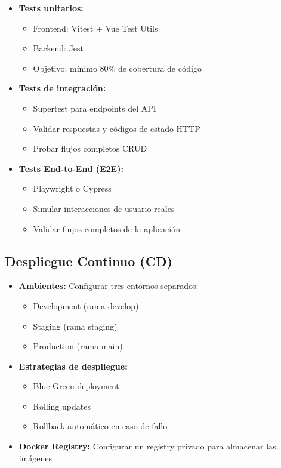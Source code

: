 \documentclass[12pt,a4paper]{article}
\begin{document}
\begin{itemize}
    \item \textbf{Tests unitarios:}
    \begin{itemize}
        \item Frontend: Vitest + Vue Test Utils
        \item Backend: Jest
        \item Objetivo: mínimo 80\% de cobertura de código
    \end{itemize}
    
    \item \textbf{Tests de integración:}
    \begin{itemize}
        \item Supertest para endpoints del API
        \item Validar respuestas y códigos de estado HTTP
        \item Probar flujos completos CRUD
    \end{itemize}
    
    \item \textbf{Tests End-to-End (E2E):}
    \begin{itemize}
        \item Playwright o Cypress
        \item Simular interacciones de usuario reales
        \item Validar flujos completos de la aplicación
    \end{itemize}
\end{itemize}

\subsection{Despliegue Continuo (CD)}

\begin{itemize}
    \item \textbf{Ambientes:} Configurar tres entornos separados:
    \begin{itemize}
        \item Development (rama develop)
        \item Staging (rama staging)
        \item Production (rama main)
    \end{itemize}
    
    \item \textbf{Estrategias de despliegue:}
    \begin{itemize}
        \item Blue-Green deployment
        \item Rolling updates
        \item Rollback automático en caso de fallo
    \end{itemize}
    
    \item \textbf{Docker Registry:} Configurar un registry privado para almacenar las imágenes
\end{itemize}
\end{document}

